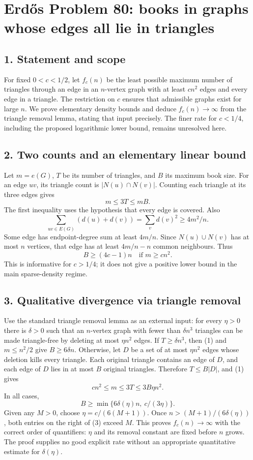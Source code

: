 \section*{Erd\H{o}s Problem 80: books in graphs whose edges all lie in triangles}
\subsection*{1. Statement and scope}
For fixed $0<c<1/2$, let $f_c(n)$ be the least possible maximum number of triangles through an edge in an $n$-vertex graph with at least $cn^2$ edges and every edge in a triangle. The restriction on $c$ ensures that admissible graphs exist for large $n$. We prove elementary density bounds and deduce $f_c(n)\to\infty$ from the triangle removal lemma, stating that input precisely. The finer rate for $c<1/4$, including the proposed logarithmic lower bound, remains unresolved here.

\subsection*{2. Two counts and an elementary linear bound}
Let $m=e(G)$, $T$ be its number of triangles, and $B$ its maximum book size. For an edge $uv$, its triangle count is $|N(u)\cap N(v)|$. Counting each triangle at its three edges gives
\[
 m\le3T\le mB. \tag{1}
\]
The first inequality uses the hypothesis that every edge is covered. Also
\[
 \sum_{uv\in E(G)}(d(u)+d(v))=\sum_v d(v)^2\ge4m^2/n.
\]
Some edge has endpoint-degree sum at least $4m/n$. Since $N(u)\cup N(v)$ has at most $n$ vertices, that edge has at least $4m/n-n$ common neighbours. Thus
\[
 B\ge (4c-1)n\quad\text{if }m\ge cn^2. \tag{2}
\]
This is informative for $c>1/4$; it does not give a positive lower bound in the main sparse-density regime.

\subsection*{3. Qualitative divergence via triangle removal}
Use the standard triangle removal lemma as an external input: for every $\eta>0$ there is $\delta>0$ such that an $n$-vertex graph with fewer than $\delta n^3$ triangles can be made triangle-free by deleting at most $\eta n^2$ edges.
If $T\ge\delta n^3$, then (1) and $m\le n^2/2$ give $B\ge6\delta n$. Otherwise, let $D$ be a set of at most $\eta n^2$ edges whose deletion kills every triangle. Each original triangle contains an edge of $D$, and each edge of $D$ lies in at most $B$ original triangles. Therefore $T\le B|D|$, and (1) gives
\[
 cn^2\le m\le3T\le3B\eta n^2.
\]
In all cases,
\[
 B\ge\min\{6\delta(\eta)n,\ c/(3\eta)\}. \tag{3}
\]
Given any $M>0$, choose $\eta=c/(6(M+1))$. Once $n> (M+1)/(6\delta(\eta))$, both entries on the right of (3) exceed $M$. This proves $f_c(n)\to\infty$ with the correct order of quantifiers: $\eta$ and its removal constant are fixed before $n$ grows. The proof supplies no good explicit rate without an appropriate quantitative estimate for $\delta(\eta)$.

